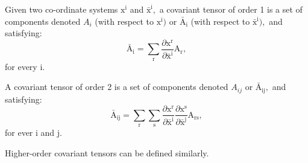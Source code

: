 Given two co-ordinate systems $ \mathrm{x}^{\mathrm{i}} $ and 
$ \bar{\mathrm{x}}^{\mathrm{i}} , $
a covariant tensor of order 1 is a set of components denoted $A_{i}$  
(with respect to $ \mathrm{x}^{\mathrm{i}} ) $ or $ \bar{\mathrm{A}}_{\mathrm{i}} $
(with respect to $ \bar{\mathrm{x}}^{\mathrm{i}} )  , $
and satisfying:
\[ \bar{\mathrm{A}}_{\mathrm{i}} 
= \sum _{\mathrm{r}} \frac{\partial \mathrm{x}^{\mathrm{r}}}
{ \partial \bar{\mathrm{x}}^{\mathrm{i}}}
\mathrm{A}_{\mathrm{r}} , \]
for every i.
\par
A covariant tensor of order 2 is a set of components denoted $A_{ij}$ 
or $ \bar{\mathrm{A}}_{\mathrm{ij}} , $ and satisfying:
\[ \bar{\mathrm{A}}_{\mathrm{ij}} =
\sum _{\mathrm{r}} \sum _{\mathrm{s}}
\frac{\partial \mathrm{x}^{\mathrm{r}}}
{\partial \bar{\mathrm{x}}^{\mathrm{i}}}
\frac{\partial \mathrm{x}^{\mathrm{s}}}
{\partial \bar{\mathrm{x}}^{\mathrm{j}}}
\mathrm{A}_{\mathrm{rs}} , \]
for ever i and j.
\par
Higher-order covariant tensors can be defined similarly.